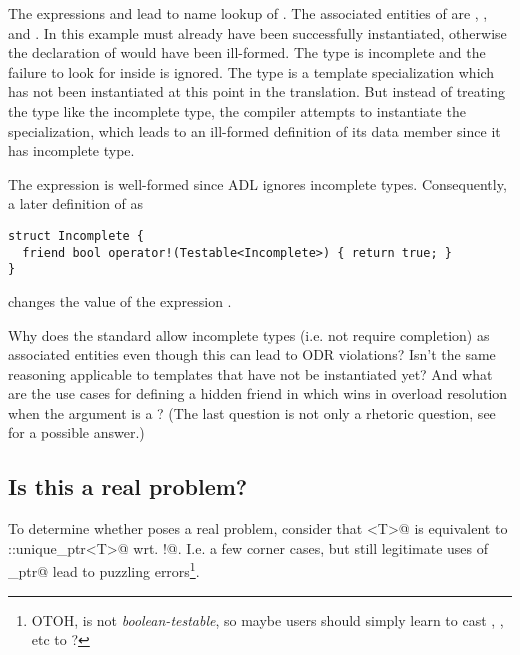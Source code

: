 The expressions  and  lead to name lookup of . The 
associated entities of  are , 
, and .
In this example  must already have been successfully 
instantiated, otherwise the declaration of  would have been ill-formed.
The type  is incomplete and the failure to look for  
inside  is ignored.
The type  is a template specialization which has not been 
instantiated at this point in the translation. But instead of treating the type like the 
incomplete  type, the compiler attempts to instantiate the 
specialization, which leads to an ill-formed definition of its data member since it has 
incomplete type.

The expression  is well-formed since ADL ignores incomplete types. Consequently, 
a later definition of  as
\medskip\begin{lstlisting}[style=Vc]
struct Incomplete {
  friend bool operator!(Testable<Incomplete>) { return true; }
}
\end{lstlisting}
changes the value of the expression .

Why does the standard allow incomplete types (i.e. not require completion) as associated 
entities even though this can lead to ODR violations? Isn't the same reasoning applicable 
to templates that have not be instantiated yet? And what are the use cases for defining a 
hidden friend in  which wins in overload resolution when the 
argument is a ? (The last question is not only a rhetoric 
question, see  for a possible answer.)

\subsection{Is this a real problem?}

To determine whether  poses a real problem, consider that 
\codelst@Testable<T>@ is equivalent to \codelst@std::unique_ptr<T>@ wrt. 
\codelst@operator!@. I.e. a few corner cases, but still legitimate uses of 
\codelst@unique_ptr@ lead to puzzling errors\footnote{OTOH,  is not 
\emph{boolean-testable}, so maybe users should simply learn to cast , 
, etc to ?}.

